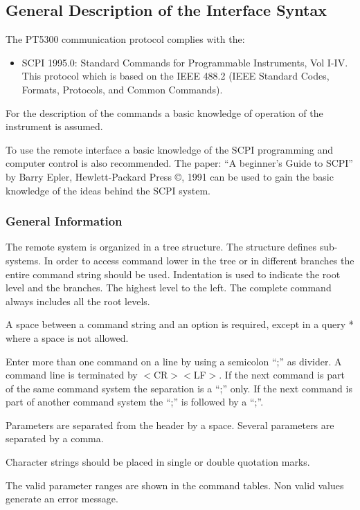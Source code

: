 \subsection{General Description of the Interface Syntax}

The PT5300 communication protocol complies with the:
\begin{itemize}
\item SCPI 1995.0: Standard Commands for Programmable Instruments, Vol I-IV. This protocol which is based on the IEEE 488.2 (IEEE Standard Codes, Formats, Protocols, and Common Commands). 
\end{itemize}

For the description of the commands a basic knowledge of operation of the instrument is assumed.

To use the remote interface a basic knowledge of the SCPI programming and computer control is also recommended. The paper: ``A beginner's Guide to SCPI'' by Barry Epler, Hewlett-Packard Press \copyright, 1991 can be used to gain the basic knowledge of the ideas behind the SCPI system.

\subsubsection{General Information}
The remote system is organized in a tree structure. The structure defines sub-systems. In order to access command lower in the tree or in different branches the entire command string should be used. Indentation is used to indicate the root level and the branches. The highest level to the left. The complete command always includes all the root levels.

A space between a command string and an option is required, except in a query * where a space is not allowed.

Enter more than one command on a line by using a semicolon ``;'' as divider. A command line is terminated by $<$CR$> <$LF$>$. If the next command is part of the same command system the separation is a ``;'' only. If the next command is part of another command system the ``;'' is followed by a ``;''.

Parameters are separated from the header by a space. Several parameters are separated by a comma. 

Character strings should be placed in single or double quotation marks. 

The valid parameter ranges are shown in the command tables. Non valid values generate an error message.


